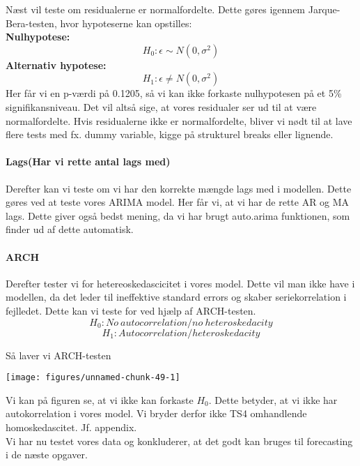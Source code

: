 \documentclass[
  10pt,
]{article}
\begin{document}
\leavevmode

Næst vil teste om residualerne er normalfordelte. Dette gøres igennem
Jarque-Bera-testen, hvor hypoteserne kan opstilles:\\
\textbf{Nulhypotese:}
\[ H_0:\epsilon \sim N(0,\sigma^2) \tag{Residualer er normalfordelte}   \]
\textbf{Alternativ hypotese:}
\[ H_1:\epsilon \neq N(0,\sigma^2) \tag{Residualerne er ikke normalfordelte} \]
Her får vi en p-værdi på 0.1205, så vi kan ikke forkaste nulhypotesen på
et 5\% signifikansniveau. Det vil altså sige, at vores residualer ser ud
til at være normalfordelte. Hvis residualerne ikke er normalfordelte,
bliver vi nødt til at lave flere tests med fx. dummy variable, kigge på
strukturel breaks eller lignende.

\hypertarget{lagshar-vi-rette-antal-lags-med}{%
\paragraph{Lags(Har vi rette antal lags
med)}\label{lagshar-vi-rette-antal-lags-med}}

\leavevmode

Derefter kan vi teste om vi har den korrekte mængde lags med i modellen.
Dette gøres ved at teste vores ARIMA model. Her får vi, at vi har de
rette AR og MA lags. Dette giver også bedst mening, da vi har brugt
auto.arima funktionen, som finder ud af dette automatisk.

\hypertarget{arch}{%
\paragraph{ARCH}\label{arch}}

\leavevmode

Derefter tester vi for hetereoskedascicitet i vores model. Dette vil man
ikke have i modellen, da det leder til ineffektive standard errors og
skaber seriekorrelation i fejlledet. Dette kan vi teste for ved hjælp af
ARCH-testen. \[ H_0 : No \ autocorrelation / no \ heteroskedacity\]
\[ H_1 : Autocorrelation / heteroskedacity\]

Så laver vi ARCH-testen

\begin{center}\texttt{[image: figures/unnamed-chunk-49-1]} \end{center}

Vi kan på figuren se, at vi ikke kan forkaste \(H_0\). Dette betyder, at
vi ikke har autokorrelation i vores model. Vi bryder derfor ikke TS4
omhandlende homoskedascitet. Jf. appendix.\\
Vi har nu testet vores data og konkluderer, at det godt kan bruges til
forecasting i de næste opgaver.
\end{document}
